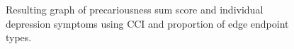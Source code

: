 \documentclass[
]{article}
\begin{document}
\begin{figure}

\begin{minipage}{\linewidth}



\end{minipage}%
\newline
\begin{minipage}{\linewidth}



\end{minipage}%

\caption{\label{fig-presum-cci}Resulting graph of precariousness sum
score and individual depression symptoms using CCI and proportion of
edge endpoint types.}

\end{figure}%
\end{document}
